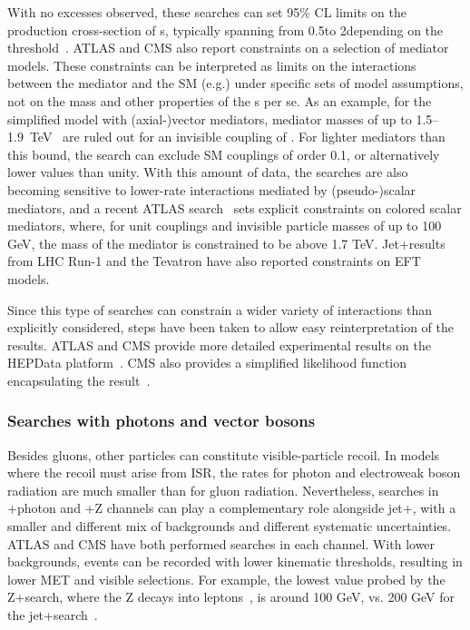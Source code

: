 With no excesses observed, these searches can set 95\% CL limits on the production cross-section of {\IP}s, typically spanning from 0.5\pb to 2\fb depending on the \MET threshold~\cite{Aaboud:2017phn}.
ATLAS and CMS also report constraints on a selection of mediator models.
These constraints can be interpreted as limits on the interactions between the mediator and the SM (e.g.\gq) under specific sets of model assumptions, not on the mass and other properties of the {\IP}s per se.
As an example, for the simplified model with (axial-)vector mediators, mediator masses of up to 1.5--1.9~TeV~\cite{Aaboud:2017phn,Sirunyan:2017jix} are ruled out for an invisible coupling of . For lighter mediators than this bound, the search can exclude SM couplings of order 0.1, or alternatively lower \gdm values than unity.
With this amount of data, the searches are also becoming sensitive to lower-rate interactions mediated by (pseudo-)scalar mediators, and a recent ATLAS search~\cite{Aaboud:2017phn} sets explicit constraints on colored scalar mediators, where, for unit couplings and invisible particle masses of up to 100 GeV, the mass of the mediator is constrained to be above 1.7 TeV. 
Jet+\MET results from LHC Run-1 and the Tevatron have also reported constraints on EFT models.  

Since this type of searches can constrain a wider variety of interactions than explicitly considered, steps have been taken to allow easy reinterpretation of the results. 
ATLAS and CMS provide more detailed experimental results on the HEPData platform~\cite{Maguire:2017ypu}.
CMS also provides a simplified likelihood function encapsulating the result~\cite{Collaboration:2242860,Sirunyan:2017jix}.


\subsubsection{Searches with photons and vector bosons}
\label{subsub:monoV}

Besides gluons, other particles can constitute visible-particle recoil.
In models where the recoil must arise from ISR, the rates for photon and electroweak boson radiation are much smaller than for gluon radiation.
Nevertheless, searches in \MET+photon and \MET+Z channels can play a complementary role alongside jet+\MET, with a smaller and different mix of backgrounds and different systematic uncertainties.
ATLAS and CMS have both performed searches in each channel.
With lower backgrounds, events can be recorded with lower kinematic thresholds, resulting in lower MET and visible \pt{} selections.
For example, the lowest \MET value probed by the Z+\MET search, where the Z decays into leptons~\cite{Sirunyan:2017qfc,Aaboud:2017bja}, is around 100 GeV, vs. 
200 GeV for the jet+\MET search~\cite{Sirunyan:2017jix}.

